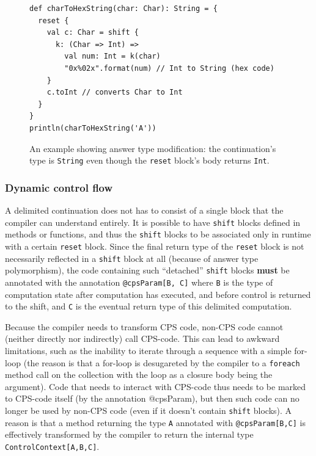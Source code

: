 \begin{figure}[h!] 
\begin{lstlisting}
def charToHexString(char: Char): String = {
  reset {
    val c: Char = shift {
      k: (Char => Int) =>
        val num: Int = k(char)
        "0x%02x".format(num) // Int to String (hex code)
    }
    c.toInt // converts Char to Int
  }
}
println(charToHexString('A'))
\end{lstlisting}
\caption{An example showing answer type modification: the continuation's type is \texttt{String} even though the \texttt{reset} block's body returns \texttt{Int}.}
\label{fig:example_cps_answer_type_modification}
\end{figure}

\subsubsection{Dynamic control flow}

A delimited continuation does not has to consist of a single block that the compiler can understand entirely. It is possible to have \texttt{shift} blocks defined in methods or functions, and thus the \texttt{shift} blocks to be associated only in runtime with a certain \texttt{reset} block. Since the final return type of the \texttt{reset} block is not necessarily reflected in a \texttt{shift} block at all (because of answer type polymorphism), the code containing such ``detached'' \texttt{shift} blocks \textbf{must} be annotated with the annotation \texttt{@cpsParam[B, C]} where \texttt{B} is the type of computation state after computation has executed, and before control is returned to the shift, and \texttt{C} is the eventual return type of this delimited computation. 

Because the compiler needs to transform CPS code, non-CPS code cannot (neither directly nor indirectly) call CPS-code. This can lead to awkward limitations, such as the inability to iterate through a sequence with a simple for-loop (the reason is that a for-loop is desugareted by the compiler to a \texttt{foreach} method call on the collection with the loop as a closure body being the argument). Code that needs to interact with CPS-code thus needs to be marked to CPS-code itself (by the annotation @cpsParam), but then such code can no longer be used by non-CPS code (even if it doesn't contain \texttt{shift} blocks). A reason is that a method returning the type \texttt{A} annotated with \texttt{@cpsParam[B,C]} is effectively transformed by the compiler to return the internal type \texttt{ControlContext[A,B,C]}. 

